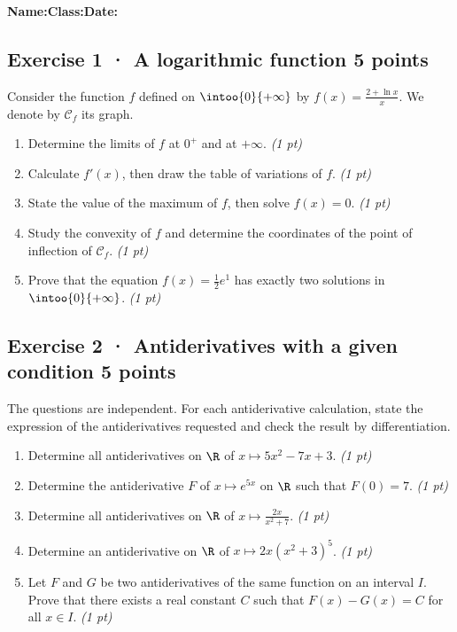 \smallskip\textbf{Name:}\enspace\dotfill\quad\textbf{Class:}\enspace\dotfill\quad\textbf{Date:}\enspace\dotfill

\subsection*{Exercise 1 · A logarithmic function \hfill 5 points}Consider the function $f$ defined on $\intoo{0}{+\infty}$ by $f(x)=\frac{2+\ln x}x$. We denote by $\mathcal C_f$ its graph.

\begin{enumerate}

\item Determine the limits of $f$ at $0^+$ and at $+\infty$. \hfill\textit{(1 pt)}

\item Calculate $f' (x)$, then draw the table of variations of $f$. \hfill\textit{(1 pt)}

\item State the value of the maximum of $f$, then solve $f(x)=0$. \hfill\textit{(1 pt)}

\item Study the convexity of $f$ and determine the coordinates of the point of inflection of $\mathcal C_f$. \hfill\textit{(1 pt)}

\item Prove that the equation $f(x)=\frac12 e^{1}$ has exactly two solutions in $\intoo{0}{+\infty}$. \hfill\textit{(1 pt)}

\end{enumerate}

\subsection*{Exercise 2 · Antiderivatives with a given condition \hfill 5 points}The  questions are independent. For each antiderivative calculation, state the expression of the antiderivatives requested and check the result by differentiation.

\begin{enumerate}

\item Determine all antiderivatives on $\R$ of $x\mapsto 5x^2-7x+3$. \hfill\textit{(1 pt)}

\item Determine the antiderivative $F$ of $x\mapsto e^{5x}$ on $\R$ such that $F(0)=7$. \hfill\textit{(1 pt)}

\item Determine all antiderivatives on $\R$ of $x\mapsto\frac{2x}{x^2+7}$. \hfill\textit{(1 pt)}

\item Determine an antiderivative on $\R$ of $x\mapsto2x(x^2+3)^{5}$. \hfill\textit{(1 pt)}

\item Let $F$ and $G$ be two antiderivatives of the same function on an interval $I$. Prove that there exists a real constant $C$ such that $F(x)-G(x)=C$ for all $x\in I$. \hfill\textit{(1 pt)}

\end{enumerate}

